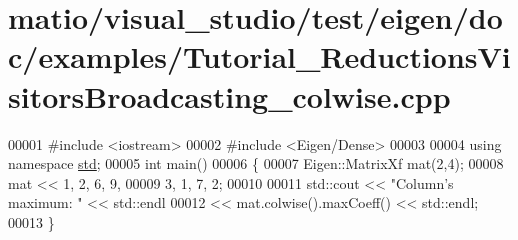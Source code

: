 \hypertarget{matio_2visual__studio_2test_2eigen_2doc_2examples_2_tutorial___reductions_visitors_broadcasting__colwise_8cpp_source}{}\section{matio/visual\+\_\+studio/test/eigen/doc/examples/\+Tutorial\+\_\+\+Reductions\+Visitors\+Broadcasting\+\_\+colwise.cpp}
\label{matio_2visual__studio_2test_2eigen_2doc_2examples_2_tutorial___reductions_visitors_broadcasting__colwise_8cpp_source}

\begin{DoxyCode}
00001 \textcolor{preprocessor}{#include <iostream>}
00002 \textcolor{preprocessor}{#include <Eigen/Dense>}
00003 
00004 \textcolor{keyword}{using namespace }\hyperlink{namespacestd}{std};
00005 \textcolor{keywordtype}{int} main()
00006 \{
00007   Eigen::MatrixXf mat(2,4);
00008   mat << 1, 2, 6, 9,
00009          3, 1, 7, 2;
00010   
00011   std::cout << \textcolor{stringliteral}{"Column's maximum: "} << std::endl
00012    << mat.colwise().maxCoeff() << std::endl;
00013 \}
\end{DoxyCode}
